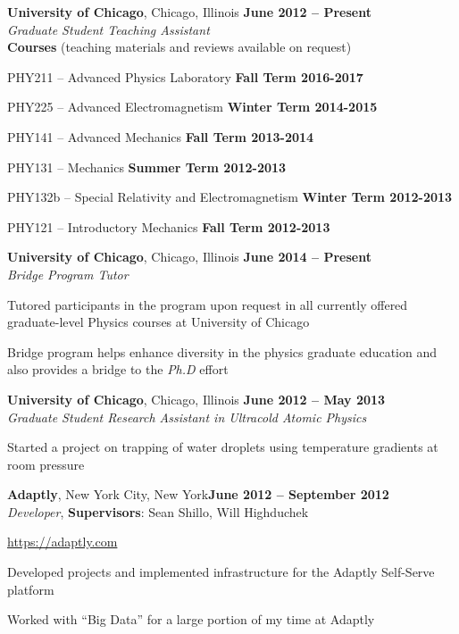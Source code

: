 \documentclass[margin,line]{resume}
\begin{document}
\begin{resume}
\newpage

\textbf{University of Chicago}, Chicago, Illinois \hfill \textbf{June 2012 -- Present}\\
\textsl{Graduate Student Teaching Assistant}\\
\textbf{Courses} (teaching materials and reviews available on request)
\begin{list2}
  \item PHY211 -- Advanced Physics Laboratory \hfill \textbf{Fall Term 2016-2017}
  \item PHY225 -- Advanced Electromagnetism \hfill \textbf{Winter Term 2014-2015}
  \item PHY141 -- Advanced Mechanics \hfill \textbf{Fall Term 2013-2014}
  \item PHY131 -- Mechanics \hfill \textbf{Summer Term 2012-2013}
  \item PHY132b -- Special Relativity and Electromagnetism \hfill \textbf{Winter Term 2012-2013}
  \item PHY121 -- Introductory Mechanics \hfill \textbf{Fall Term 2012-2013}
\end{list2}

\textbf{University of Chicago}, Chicago, Illinois \hfill \textbf{June 2014 -- Present}\\
\textsl{Bridge Program Tutor}
\begin{list2}
  \item Tutored participants in the program upon request in all currently offered graduate-level Physics courses at University of Chicago
  \item Bridge program helps enhance diversity in the physics graduate education and also provides a bridge to the \textsl{Ph.D} effort
\end{list2}

\textbf{University of Chicago}, Chicago, Illinois  \hfill \textbf{June 2012 -- May 2013}\\
\textsl{Graduate Student Research Assistant in Ultracold Atomic Physics}
\begin{list2}
  \item Started a project on trapping of water droplets using temperature gradients at room pressure
\end{list2}

\textbf{Adaptly}, New York City, New York\hfill \textbf{June 2012 -- September 2012}\\
\textsl{Developer}, \textbf{Supervisors}: Sean Shillo, Will Highduchek
\begin{list2}
  \item \url{https://adaptly.com}
  \item Developed projects and implemented infrastructure for the Adaptly Self-Serve platform
  \item Worked with ``Big Data'' for a large portion of my time at Adaptly
\end{list2}


\end{resume}
\end{document}
